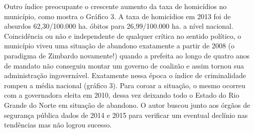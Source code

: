 \documentclass[
	12pt,				%
	openright,			%
	twoside,			%
	a4paper,			%
	chapter=TITLE,		%
	section=TITLE,		%
	subsection=TITLE,	%
	subsubsection=TITLE,%
	spanish,            %
	english,			%
	brazil				%
	]{abntex2}
\begin{document}
\par
Outro índice preocupante o crescente aumento da taxa de homicídios no município, como mostra o Gráfico 3. A taxa de homicídios em 2013 foi de absurdos 62,30/100.000 ha. óbitos para 26,99/100.000 ha. a nível nacional. Coincidência ou não e independente de qualquer crítica no sentido político, o município viveu uma situação de abandono exatamente a partir de 2008 (o paradigma de Zimbardo novamente!) quando a prefeita ao longo de quatro anos de mandato não conseguiu montar um governo de coalizão e assim tornou sua administração ingovernável. Exatamente nessa época o índice de criminalidade rompeu a média nacional (gráfico 3). Para coroar a situação, o mesmo ocorreu com a governadora eleita em 2010, dessa vez deixando todo o Estado do Rio Grande do Norte em situação de abandono. O autor buscou junto aos órgãos de segurança pública dados de 2014 e 2015 para verificar um eventual declínio nas tendências mas não logrou sucesso.
\end{document}
